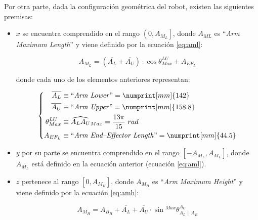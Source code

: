 Por otra parte, dada la configuración geométrica del robot, existen las siguientes premisas:

\begin{itemize}
    \item $x$ se encuentra comprendido en el rango $\left(0, A_{M_L}\right]$, donde $A_{ML}$
          es ``\textit{Arm Maximum Length}'' y viene definido por la ecuación \ref{eq:aml}:

          \begin{equation}\label{eq:aml}
              A_{M_L} = \left(\overline{A_L} + \overline{A_U}\right) \cdot \cos{\theta^{LU}_{Max}} + A_{EF_L}
          \end{equation}

          donde cada uno de los elementos anteriores representan:

          \begin{equation*}
              \left\{\begin{aligned}
                  \overline{A_L}    & \equiv \text{``\textit{Arm Lower}''} = \numprint[mm]{142}                 \\
                  \overline{A_U}    & \equiv \text{``\textit{Arm Upper}''} = \numprint[mm]{158.8}               \\
                  \theta^{LU}_{Max} & \equiv \widehat{A_L A_U}_{Max} = \frac{13\pi}{15}~rad                     \\
                  A_{EF_L}          & \equiv \text{``\textit{Arm End--Effector Length}''} = \numprint[mm]{44.5} \\
              \end{aligned}
              \right.
          \end{equation*}

    \item $y$ por su parte se encuentra comprendido en el rango $\left[-A_{M_L}, A_{M_L}\right]$,
          donde $A_{M_L}$ está definido en la ecuación anterior (ecuación \ref{eq:aml}).
    \item $z$ pertenece al rango $\left[0, A_{M_H}\right]$, donde $A_{M_H}$ es
          ``\textit{Arm Maximum Height}'' y viene definido por la ecuación \ref{eq:amh}:

          \begin{equation}\label{eq:amh}
              A_{M_H} = A_{B_H} + \overline{A_L} + \overline{A_U} \cdot \sin{^{Max}\theta^{A_U}_{A_L \parallel A_B}}
          \end{equation}


\end{itemize}
